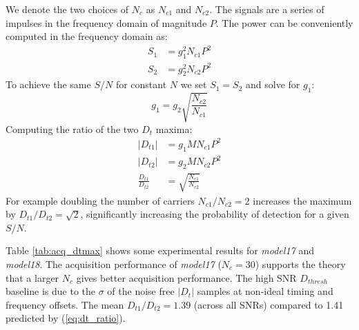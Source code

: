 \documentclass{article}
\begin{document}
We denote the two choices of $N_c$ as $N_{c1}$ and $N_{c2}$. The signals are a series of impulses in the frequency domain of magnitude $P$. The power can be conveniently computed in the frequency domain as:
\begin{equation}
\begin{split}
S_1 &= g_1^2 N_{c1} P^2 \\
S_2 &= g_2^2 N_{c2} P^2
\end{split}
\end{equation}
To achieve the same $S/N$ for constant $N$ we set $S_1=S_2$ and solve for $g_1$:
\begin{equation}
g_1=g_2 \sqrt{\frac{N_{c2}}{N_{c1}}}
\end{equation}
Computing the ratio of the two $D_t$ maxima:
\begin{equation}
\label{eq:dt_ratio}
\begin{split}
|D_{t1}| &= g_1 M N_{c1} P^2 \\
|D_{t2}| &= g_2 M N_{c2} P^2 \\
\frac{D_{t1}}{D_{t2}} &= \sqrt{\frac{N_{c1}}{N_{c2}}}
\end{split}
\end{equation}
For example doubling the number of carriers $N_{c1}/N_{c2}=2$ increases the maximum by $D_{t1}/D_{t2}=\sqrt{2}$, significantly increasing the probability of detection for a given $S/N$.

Table \ref{tab:acq_dtmax} shows some experimental results for \emph{model17} and \emph{model18}.  The acquisition performance of \emph{model17} ($N_c=30$) supports the theory that a larger $N_c$ gives better acquisition performance.  The high SNR $D_{thresh}$ baseline is due to the $\sigma$ of the noise free $|D_t|$ samples at non-ideal timing and frequency offsets. The mean $D_{t1}/D_{t2}=1.39$ (across all SNRs) compared to 1.41 predicted by (\ref{eq:dt_ratio}).
 
\end{document}
